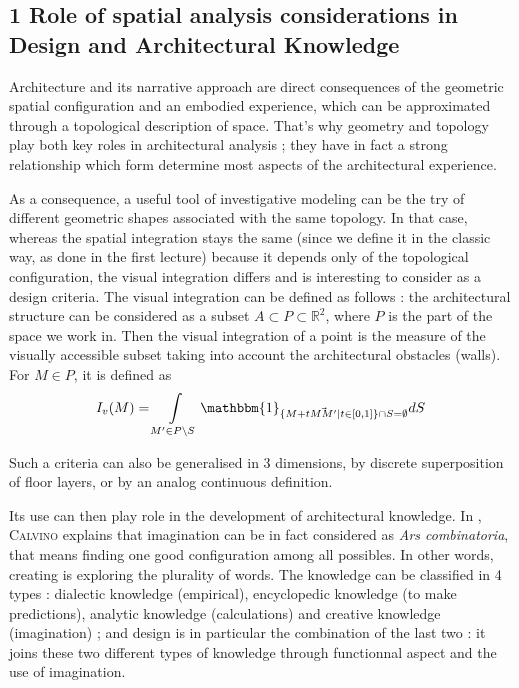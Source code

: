 \documentclass[english]{article}
\newcommand{\noun}[1]{\textsc{#1}}
\begin{document}
\bigskip{}
\bigskip{}
\bigskip{}



\subsection*{1 Role of spatial analysis considerations in Design and Architectural
Knowledge}

Architecture and its narrative approach are direct consequences of
the geometric spatial configuration and an embodied experience, which
can be approximated through a topological description of space. That's
why geometry and topology play both key roles in architectural analysis
; they have in fact a strong relationship which form determine most
aspects of the architectural experience.

\bigskip{}


As a consequence, a useful tool of investigative modeling can be the
try of different geometric shapes associated with the same topology.
In that case, whereas the spatial integration stays the same (since
we define it in the classic way, as done in the first lecture) because
it depends only of the topological configuration, the visual integration
differs and is interesting to consider as a design criteria. The visual
integration can be defined as follows : the architectural structure
can be considered as a subset $A\subset P\subset\mathbb{R}^{2}$,
where $P$ is the part of the space we work in. Then the visual integration
of a point is the measure of the visually accessible subset taking
into account the architectural obstacles (walls). For $M\in P$, it
is defined as \[I_{v}(M)=\intop_{M'\in P \backslash S}{\mathbbm{1}_{\{M+t \vec{MM'}|t\in [0,1]\} \cap S = \emptyset} dS}\]

Such a criteria can also be generalised in 3 dimensions, by discrete
superposition of floor layers, or by an analog continuous definition.

\bigskip{}


Its use can then play role in the development of architectural knowledge.
In \cite{calvino1978invisible}, \noun{Calvino} explains that imagination
can be in fact considered as \textit{Ars combinatoria}, that means
finding one good configuration among all possibles. In other words,
creating is exploring the plurality of words. The knowledge can be
classified in 4 types : dialectic knowledge (empirical), encyclopedic
knowledge (to make predictions), analytic knowledge (calculations)
and creative knowledge (imagination) ; and design is in particular
the combination of the last two : it joins these two different types
of knowledge through functionnal aspect and the use of imagination.
\end{document}
